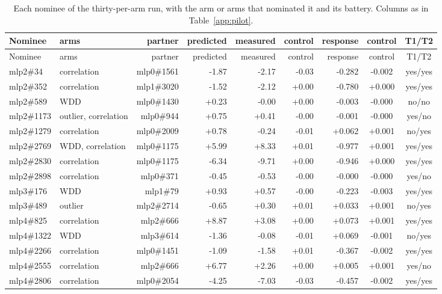 \begin{center}\scriptsize
\begin{longtable}{llrrrrrcc}
\caption{Each nominee of the thirty-per-arm run, with the arm or arms that nominated it and its battery. Columns as in Table~\ref{app:pilot}.}\label{app:n30}\\ \toprule
Nominee & arms & partner & predicted & measured & control & response & control & T1/T2 \\ \midrule \endfirsthead
\toprule Nominee & arms & partner & predicted & measured & control & response & control & T1/T2 \\ \midrule \endhead
\bottomrule \endfoot
mlp2\#34 & correlation & mlp0\#1561 & -1.87 & -2.17 & -0.03 & -0.282 & -0.002 & yes/yes \\
mlp2\#352 & correlation & mlp1\#3020 & -1.52 & -2.12 & +0.00 & -0.780 & +0.000 & yes/yes \\
mlp2\#589 & WDD & mlp0\#1430 & +0.23 & -0.00 & +0.00 & -0.003 & -0.000 & no/no \\
mlp2\#1173 & outlier, correlation & mlp0\#944 & +0.75 & +0.41 & -0.00 & -0.001 & -0.000 & yes/no \\
mlp2\#1279 & correlation & mlp0\#2009 & +0.78 & -0.24 & -0.01 & +0.062 & +0.001 & no/yes \\
mlp2\#2769 & WDD, correlation & mlp0\#1175 & +5.99 & +8.33 & +0.01 & -0.977 & +0.001 & yes/yes \\
mlp2\#2830 & correlation & mlp0\#1175 & -6.34 & -9.71 & +0.00 & -0.946 & +0.000 & yes/yes \\
mlp2\#2898 & correlation & mlp0\#371 & -0.45 & -0.53 & -0.00 & -0.000 & -0.000 & yes/no \\
mlp3\#176 & WDD & mlp1\#79 & +0.93 & +0.57 & -0.00 & -0.223 & -0.003 & yes/yes \\
mlp3\#489 & outlier & mlp2\#2714 & -0.65 & +0.30 & +0.01 & +0.033 & +0.001 & no/yes \\
mlp4\#825 & correlation & mlp2\#666 & +8.87 & +3.08 & +0.00 & +0.073 & +0.001 & yes/yes \\
mlp4\#1322 & WDD & mlp3\#614 & -1.36 & -0.08 & -0.01 & +0.069 & -0.001 & no/yes \\
mlp4\#2266 & correlation & mlp0\#1451 & -1.09 & -1.58 & +0.01 & -0.367 & -0.002 & yes/yes \\
mlp4\#2555 & correlation & mlp2\#666 & +6.77 & +2.26 & +0.00 & +0.005 & +0.001 & yes/no \\
mlp4\#2806 & correlation & mlp0\#2054 & -4.25 & -7.03 & -0.03 & -0.457 & -0.002 & yes/yes \\

\end{longtable}
\end{center}
